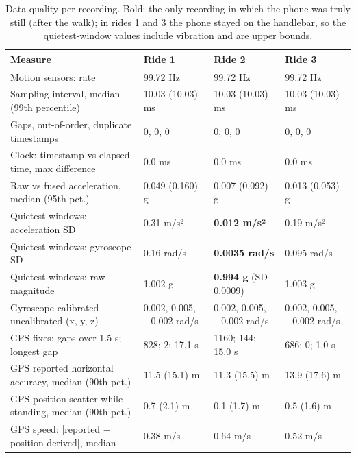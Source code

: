 \begin{table}[htbp]
\centering\small
\caption{Data quality per recording. Bold: the only recording in which the phone was
truly still (after the walk); in rides 1 and 3 the phone stayed on the handlebar, so the
quietest-window values include vibration and are upper bounds.}\label{tab:Bquality}
\begin{tabular}{@{}p{56mm}p{28mm}p{30mm}p{28mm}@{}}
\toprule
Measure & Ride 1 & Ride 2 & Ride 3 \\
\midrule
Motion sensors: rate & 99.72 Hz & 99.72 Hz & 99.72 Hz \\
Sampling interval, median (99th percentile) & 10.03 (10.03) ms & 10.03 (10.03) ms & 10.03 (10.03) ms \\
Gaps, out-of-order, duplicate timestamps & 0, 0, 0 & 0, 0, 0 & 0, 0, 0 \\
Clock: timestamp vs elapsed time, max difference & 0.0 ms & 0.0 ms & 0.0 ms \\
Raw vs fused acceleration, median (95th pct.) & 0.049 (0.160) g & 0.007 (0.092) g & 0.013 (0.053) g \\
Quietest windows: acceleration SD & 0.31 m/s² & \textbf{0.012 m/s²} & 0.19 m/s² \\
Quietest windows: gyroscope SD & 0.16 rad/s & \textbf{0.0035 rad/s} & 0.095 rad/s \\
Quietest windows: raw magnitude & 1.002 g & \textbf{0.994 g} (SD 0.0009) & 1.003 g \\
Gyroscope calibrated − uncalibrated (x, y, z) & 0.002, 0.005, −0.002 rad/s & 0.002, 0.005, −0.002 rad/s & 0.002, 0.005, −0.002 rad/s \\
GPS fixes; gaps over 1.5 s; longest gap & 828; 2; 17.1 s & 1160; 144; 15.0 s & 686; 0; 1.0 s \\
GPS reported horizontal accuracy, median (90th pct.) & 11.5 (15.1) m & 11.3 (15.5) m & 13.9 (17.6) m \\
GPS position scatter while standing, median (90th pct.) & 0.7 (2.1) m & 0.1 (1.7) m & 0.5 (1.6) m \\
GPS speed: |reported − position-derived|, median & 0.38 m/s & 0.64 m/s & 0.52 m/s \\
\bottomrule
\end{tabular}
\end{table}

